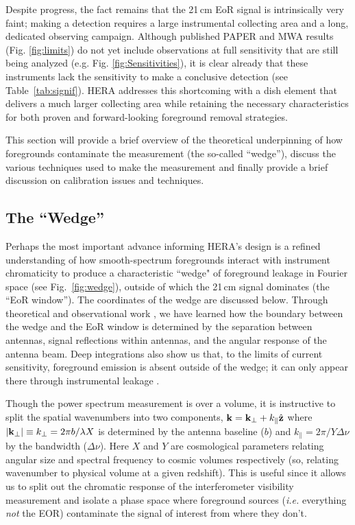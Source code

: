 \documentclass[preprint,11pt]{aastex}
\newcommand{\kvec}{{\bf k}}
\newcommand{\kpr}{{k_\perp}}
\newcommand{\kvpr}{{\kvec_\perp}}
\def\kpar{k_{\|}}
\begin{document}
Despite progress, the fact remains that the 21\,cm EoR signal is intrinsically very faint; making a detection requires a
large instrumental collecting area and a long, dedicated observing campaign.
Although published PAPER and MWA results (Fig. \ref{fig:limits}) do not yet include observations 
at full sensitivity that are still being analyzed (e.g. Fig. \ref{fig:Sensitivities}), 
it is clear already that these instruments lack the sensitivity
to make a conclusive detection (see Table~\ref{tab:signif}). 
HERA addresses this shortcoming with a dish element that delivers a much larger collecting area 
while retaining the necessary characteristics for both proven and forward-looking foreground removal strategies.

This section will provide a brief overview of  the theoretical underpinning of how foregrounds contaminate the measurement (the so-called ``wedge''), discuss the various techniques used to make the measurement and finally provide a brief discussion on calibration issues and techniques.

\subsection{The ``Wedge''}
\label{sec:wedge}
Perhaps the most important advance informing HERA's design is a
refined understanding of how smooth-spectrum foregrounds interact
with instrument chromaticity to produce a characteristic ``wedge" of
foreground leakage in Fourier space (see Fig.~\ref{fig:wedge}), 
outside of which the 21\,cm signal dominates (the ``EoR window'').  The coordinates of the wedge are discussed below.
Through theoretical and observational work
\citep{datta_etal2010,morales_et_al2012,parsons_et_al2012b,vedantham_2012,thyagarajan_et_al2013,hazelton_et_al2013,pober_etal2013b,liu_et_al2014a,liu_et_al2014b},
we have learned how the boundary between the wedge and  the EoR window is determined by the separation between antennas,
signal reflections within antennas, and the angular response of the antenna beam.  Deep integrations also show us
that, to the limits of current sensitivity, foreground emission is absent outside of the wedge; it can only 
appear there through instrumental leakage \citep{parsons_etal2014,ali_et_al2015,moore_et_al2016,kohn_et_al2016}.

Though the power spectrum measurement is over a volume, it is instructive to split the spatial wavenumbers into two components,  $\kvec =  \kvpr + \kpar{\hat {\bf z}}$ where $|\kvpr|\equiv \kpr = 2\pi b/\lambda X$ is determined by the antenna baseline ($b$) and $\kpar=2\pi/Y\Delta\nu$ by the bandwidth ($\Delta\nu$).  Here $X$ and $Y$ are cosmological parameters relating angular size and spectral frequency to cosmic volumes respectively (so, relating wavenumber to physical volume at a given redshift).  This is useful since it allows us to split out the chromatic response of the interferometer visibility measurement and isolate a phase space where foreground sources ({\em i.e.} everything {\em not} the EOR) contaminate the signal of interest from where they don't.  
\end{document}
